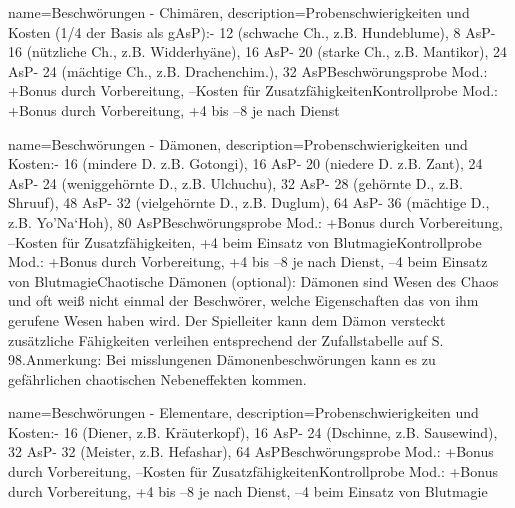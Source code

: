 {
    name={Beschwörungen - Chimären},
    description={Probenschwierigkeiten und Kosten (1/4 der Basis als gAsP):\newline - 12 (schwache Ch., z.B. Hundeblume), 8 AsP\newline - 16 (nützliche Ch., z.B. Widderhyäne), 16 AsP\newline - 20 (starke Ch., z.B. Mantikor), 24 AsP\newline - 24 (mächtige Ch., z.B. Drachenchim.), 32 AsP\newline Beschwörungsprobe Mod.: +Bonus durch Vorbereitung, –Kosten für Zusatzfähigkeiten\newline Kontrollprobe Mod.: +Bonus durch Vorbereitung, +4 bis –8 je nach Dienst}
}


{
    name={Beschwörungen - Dämonen},
    description={Probenschwierigkeiten und Kosten:\newline - 16 (mindere D. z.B. Gotongi), 16 AsP\newline - 20 (niedere D. z.B. Zant), 24 AsP\newline - 24 (weniggehörnte D., z.B. Ulchuchu), 32 AsP\newline - 28 (gehörnte D., z.B. Shruuf), 48 AsP\newline - 32 (vielgehörnte D., z.B. Duglum), 64 AsP\newline - 36 (mächtige D., z.B. Yo’Na‘Hoh), 80 AsP\newline Beschwörungsprobe Mod.: +Bonus durch Vorbereitung, –Kosten für Zusatzfähigkeiten, +4 beim Einsatz von Blutmagie\newline Kontrollprobe Mod.: +Bonus durch Vorbereitung, +4 bis –8 je nach Dienst, –4 beim Einsatz von Blutmagie\newline Chaotische Dämonen (optional): Dämonen sind Wesen des Chaos und oft weiß nicht einmal der Beschwörer, welche Eigenschaften das von ihm gerufene Wesen haben wird. Der Spielleiter kann dem Dämon versteckt zusätzliche Fähigkeiten verleihen entsprechend der Zufallstabelle auf S. 98.\newline Anmerkung: Bei misslungenen Dämonenbeschwörungen kann es zu gefährlichen chaotischen Nebeneffekten kommen. }
}


{
    name={Beschwörungen - Elementare},
    description={Probenschwierigkeiten und Kosten:\newline - 16 (Diener, z.B. Kräuterkopf), 16 AsP\newline - 24 (Dschinne, z.B. Sausewind), 32 AsP\newline - 32 (Meister, z.B. Hefashar), 64 AsP\newline Beschwörungsprobe Mod.: +Bonus durch Vorbereitung, –Kosten für Zusatzfähigkeiten\newline Kontrollprobe Mod.: +Bonus durch Vorbereitung, +4 bis –8 je nach Dienst, –4 beim Einsatz von Blutmagie}
}


